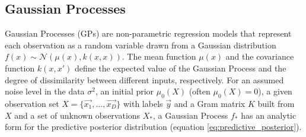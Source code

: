 \documentclass{IOS-Book-Article}
\begin{document}
	\subsection{Gaussian Processes}
	Gaussian Processes (GPs) are non-parametric regression models that represent each observation as a random variable drawn from a Gaussian distribution $f(x) \sim \mathcal{N}(\mu(x), k(x,x))$\cite{gaussian-processes}. The mean function $\mu(x)$ and the covariance function $k(x,x')$ define the expected value of the Gaussian Process and the degree of dissimilarity between different inputs, respectively. For an assumed noise level in the data $\sigma^2$, an initial prior $\mu_0(X)$ (often $\mu_0(X)=0$), a given observation set $X=\{\vec{x_1}, ..., \vec{x_D}\}$ with labels $\vec{y}$ and a Gram matrix $K$ built from $X$ and a set of unknown observations $X_*$, a Gaussian Process $f_*$ has an analytic form for the predictive posterior distribution (equation \ref{eq:predictive_posterior}).%
	
	
\end{document}
